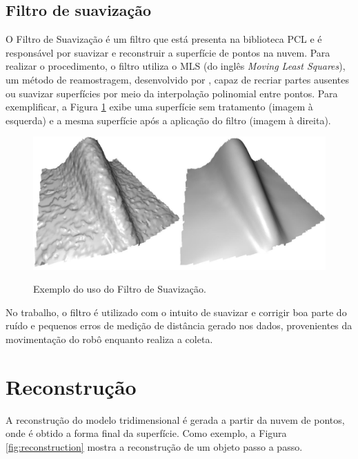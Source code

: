 \subsection{Filtro de suavização}
\label{sec:smoothing_filter}

O Filtro de Suavização é um filtro que está presenta na biblioteca PCL e é responsável por suavizar e reconstruir a superfície de pontos na nuvem. 
Para realizar o procedimento, o filtro utiliza o MLS (do inglês \textit{Moving Least Squares}), um método de reamostragem, desenvolvido por \cite{levin1998mls}, capaz de recriar partes ausentes ou suavizar superfícies por meio da interpolação polinomial entre pontos. 
Para exemplificar, a Figura \ref{fig:smoothing_filter} exibe uma superfície sem tratamento (imagem à esquerda) e a mesma superfície após a aplicação do filtro (imagem à direita).

\begin{figure}[H]
    \centering
    \caption{Exemplo do uso do Filtro de Suavização.}
    \includegraphics[scale=0.3]{dados/figuras/mls_filter.jpg}
    \label{fig:smoothing_filter}
\end{figure}

No trabalho, o filtro é utilizado com o intuito de suavizar e corrigir boa parte do ruído e pequenos erros de medição de distância gerado nos dados, provenientes da movimentação do robô enquanto realiza a coleta.

\section{Reconstrução}
\label{sec:reconstrucao}

A reconstrução do modelo tridimensional é gerada a partir da nuvem de pontos, onde é obtido a forma final da superfície. 
Como exemplo, a Figura \ref{fig:reconstruction} mostra a reconstrução de um objeto passo a passo.

